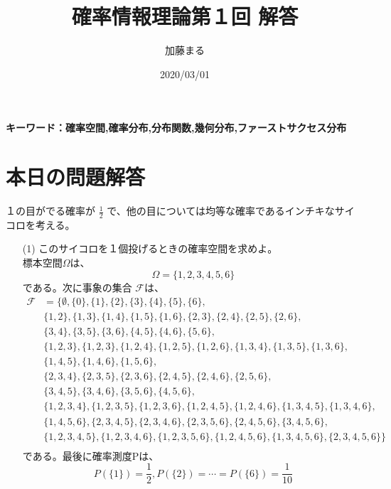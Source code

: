 \documentclass[a4j,uplatex]{jsarticle}
\title{確率情報理論第１回 解答}
\author{加藤まる}
\date{2020/03/01}
\begin{document}
\maketitle
\bf キーワード：確率空間,確率分布,分布関数,幾何分布,ファーストサクセス分布
\rm

\section*{本日の問題解答}
１の目がでる確率が $\frac{1}{2}$ で、他の目については均等な確率であるインチキなサイコロを考える。
\begin{itemize}
  \item[(1)] このサイコロを１個投げるときの確率空間を求めよ。 
  \\ 
  標本空間$\Omega $は、
  \begin{equation}
    \Omega = \{ 1,2,3,4,5,6 \} 
  \end{equation}
  である。次に事象の集合 $\mathscr F$は、
  \begin{equation}
    \begin{split}
       \mathscr F &= \{ \emptyset,\{ 0 \},\{ 1\},\{ 2\},\{ 3\},\{ 4\},\{ 5\},\{ 6\},\\
      &\{ 1,2\},\{ 1,3\},\{ 1,4\},\{ 1,5\},\{ 1,6\},\{ 2,3\},\{ 2,4\},\{ 2,5\},\{ 2,6\},\\
      &\{ 3,4\},\{ 3,5\},\{ 3,6\},\{ 4,5\},\{ 4,6\},\{ 5,6\},\\
      &\{ 1,2,3\},\{ 1,2,3\},\{ 1,2,4\},\{ 1,2,5\},\{ 1,2,6\},\{ 1,3,4\},\{ 1,3,5\},\{ 1,3,6\},\\
      &\{ 1,4,5\},\{ 1,4,6\},\{ 1,5,6\},\\
      &\{ 2,3,4\},\{ 2,3,5\},\{ 2,3,6\},\{ 2,4,5\},\{ 2,4,6\},\{ 2,5,6\},\\
      &\{ 3,4,5\},\{ 3,4,6\},\{ 3,5,6\},\{ 4,5,6\},\\
      &\{ 1,2,3,4\},\{ 1,2,3,5\},\{ 1,2,3,6\},\{ 1,2,4,5\},\{ 1,2,4,6\},\{ 1,3,4,5\},\{ 1,3,4,6\},\\
      &\{ 1,4,5,6\},\{ 2,3,4,5\},\{ 2,3,4,6\},\{ 2,3,5,6\},\{ 2,4,5,6\},\{ 3,4,5,6\},\\
      &\{ 1,2,3,4,5\},\{ 1,2,3,4,6\},\{ 1,2,3,5,6\},\{ 1,2,4,5,6\},\{ 1,3,4,5,6\},\{ 2,3,4,5,6\} \}\\
    \end{split}
  \end{equation}
  である。最後に確率測度Pは、
  \begin{equation}
    P(\{1\})=\frac{1}{2},P(\{2\})= \cdots = P(\{6\}) = \frac{1}{10}
  \end{equation}


\end{itemize}
\end{document}
